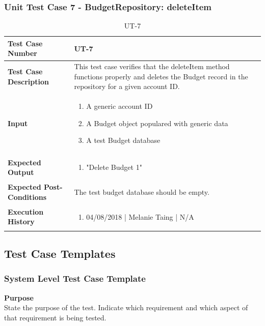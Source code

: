 \documentclass[12pt]{article}
\begin{document}
\subsubsection{Unit Test Case 7 - BudgetRepository: deleteItem}
\def\arraystretch{1.5}%
\begin{table}[htbp]
\centering
\caption {UT-7}
\label{UT-7}
\begin{tabularx}{\textwidth}{ | l | X |}
\hline
\textbf{Test Case Number}      &  UT-7                         \\ \hline
\textbf{Test Case Description}    &  This test case verifies that the deleteItem method functions properly and deletes the Budget record in the repository for a given account ID.         \\ \hline
\textbf{Input}         & 	\begin{enumerate}
	\item A generic account ID
	\item A Budget object populared with generic data
	\item A test Budget database
\end{enumerate} \\ \hline

\textbf{Expected Output}     & \begin{enumerate}
	\item "Delete Budget 1"
\end{enumerate} \\ \hline
\textbf{Expected Post-Conditions}           & The test budget database should be empty.            \\ \hline
\textbf{Execution History}   &  \begin{enumerate}
	\item 04/08/2018 | Melanie Taing | N/A
\end {enumerate} \\ \hline
\end{tabularx}
\end{table}
\clearpage

\subsection{Test Case Templates}

\subsubsection{System Level Test Case Template}
\noindent
{\bf Purpose}\\
State the purpose of the test.
Indicate which requirement and which aspect of that requirement is being tested.
\end{document}
